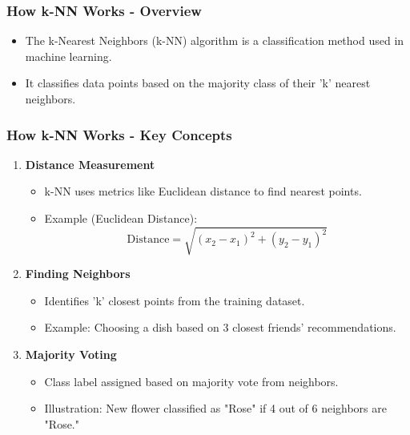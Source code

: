 \documentclass[aspectratio=169]{beamer}
\begin{document}
\begin{frame}[fragile]
    \frametitle{How k-NN Works - Overview}
    \begin{itemize}
        \item The k-Nearest Neighbors (k-NN) algorithm is a classification method used in machine learning.
        \item It classifies data points based on the majority class of their 'k' nearest neighbors.
    \end{itemize}
\end{frame}

\begin{frame}[fragile]
    \frametitle{How k-NN Works - Key Concepts}
    \begin{enumerate}
        \item \textbf{Distance Measurement}
            \begin{itemize}
                \item k-NN uses metrics like Euclidean distance to find nearest points.
                \item Example (Euclidean Distance):
                    \begin{equation}
                        \text{Distance} = \sqrt{(x_2 - x_1)^2 + (y_2 - y_1)^2}
                    \end{equation}
            \end{itemize}

        \item \textbf{Finding Neighbors}
            \begin{itemize}
                \item Identifies 'k' closest points from the training dataset.
                \item Example: Choosing a dish based on 3 closest friends' recommendations.
            \end{itemize}

        \item \textbf{Majority Voting}
            \begin{itemize}
                \item Class label assigned based on majority vote from neighbors.
                \item Illustration: New flower classified as "Rose" if 4 out of 6 neighbors are "Rose."
            \end{itemize}
    \end{enumerate}
\end{frame}
\end{document}
